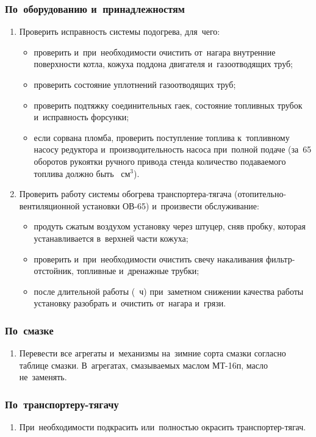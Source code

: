 \subsubsection{По~оборудованию и~принадлежностям}
\begin{enumerate}
    \item Проверить исправность системы подогрева, для~чего:
        \begin{itemize}
            \item проверить и~при~необходимости очистить от~нагара внутренние поверхности котла, кожуха поддона двигателя и~газоотводящих труб; 
            \item проверить состояние уплотнений газоотводящих труб; 
            \item проверить подтяжку соединительных гаек, состояние топливных трубок и~исправность форсунки; 
            \item если сорвана пломба, проверить поступление топлива к~топливному насосу редуктора и~производительность насоса при~полной подаче (за~65 оборотов рукоятки ручного привода стенда количество подаваемого топлива должно быть ~см$^3$). 
        \end{itemize}
    \item Проверить работу системы обогрева транспортера-тягача (отопительно-вентиляционной установки ОВ-65) и~произвести обслуживание:
        \begin{itemize}
            \item продуть сжатым воздухом установку через штуцер, сняв пробку, которая устанавливается в~верхней части кожуха; 
            \item проверить и~при~необходимости очистить свечу накаливания фильтр-отстойник, топливные и~дренажные трубки; 
            \item после длительной работы (~ч) при~заметном снижении качества работы установку разобрать и~очистить от~нагара и~грязи.
        \end{itemize}
\end{enumerate}

\subsubsection{По~смазке}
\begin{enumerate}
    \item Перевести все агрегаты и~механизмы на~зимние сорта смазки согласно таблице смазки. В~агрегатах, смазываемых маслом МТ-16п, масло не~заменять. 
\end{enumerate}

\subsubsection{По~транспортеру-тягачу}
\begin{enumerate}
    \item При~необходимости подкрасить или~полностью окрасить транспортер-тягач. 
\end{enumerate}

